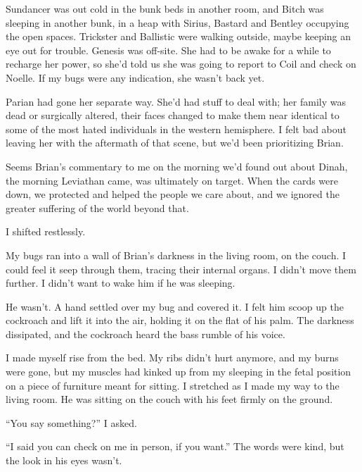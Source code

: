 Sundancer was out cold in the bunk beds in another room, and Bitch was sleeping in another bunk, in a heap with Sirius, Bastard and Bentley occupying the open spaces.  Trickster and Ballistic were walking outside, maybe keeping an eye out for trouble.  Genesis was off-site.  She had to be awake for a while to recharge her power, so she'd told us she was going to report to Coil and check on Noelle.  If my bugs were any indication, she wasn't back yet.



Parian had gone her separate way.  She'd had stuff to deal with; her family was dead or surgically altered, their faces changed to make them near identical to some of the most hated individuals in the western hemisphere.  I felt bad about leaving her with the aftermath of that scene, but we'd been prioritizing Brian.



Seems Brian's commentary to me on the morning we'd found out about Dinah, the morning Leviathan came, was ultimately on target.  When the cards were down, we protected and helped the people we care about, and we ignored the greater suffering of the world beyond that.



I shifted restlessly.



My bugs ran into a wall of Brian's darkness in the living room, on the couch.  I could feel it seep through them, tracing their internal organs.  I didn't move them further.  I didn't want to wake him if he was sleeping.



He wasn't.  A hand settled over my bug and covered it.  I felt him scoop up the cockroach and lift it into the air, holding it on the flat of his palm.  The darkness dissipated, and the cockroach heard the bass rumble of his voice.



I made myself rise from the bed.  My ribs didn't hurt anymore, and my burns were gone, but my muscles had kinked up from my sleeping in the fetal position on a piece of furniture meant for sitting.  I stretched as I made my way to the living room.  He was sitting on the couch with his feet firmly on the ground.



``You say something?''  I asked.



``I said you can check on me in person, if you want.''  The words were kind, but the look in his eyes wasn't.



